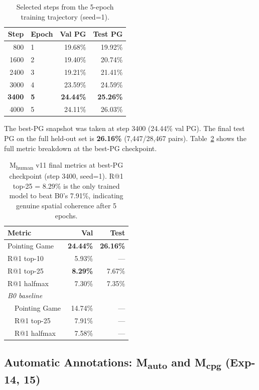 \documentclass{article}
\begin{document}
\begin{table}[H]
\centering
\caption{Selected steps from the 5-epoch training trajectory (seed=1).}
\label{tab:v11traj}
\begin{tabular}{rlrr}
\toprule
Step & Epoch & Val PG & Test PG \\
\midrule
800  & 1 & 19.68\% & 19.92\% \\
1600 & 2 & 19.40\% & 20.74\% \\
2400 & 3 & 19.21\% & 21.41\% \\
3000 & 4 & 23.59\% & 24.59\% \\
\textbf{3400} & \textbf{5} & \textbf{24.44\%} & \textbf{25.26\%} \\
4000 & 5 & 24.11\% & 26.03\% \\
\bottomrule
\end{tabular}
\end{table}

The best-PG snapshot was taken at step 3400 (24.44\% val PG). The final test
PG on the full held-out set is \textbf{26.16\%} (7,447/28,467 pairs).
Table~\ref{tab:v11final} shows the full metric breakdown at the best-PG
checkpoint.

\begin{table}[H]
\centering
\caption{M\textsubscript{human} v11 final metrics at best-PG checkpoint
(step 3400, seed=1). R@1 top-25 = 8.29\% is the only trained model to
beat B0's 7.91\%, indicating genuine spatial coherence after 5 epochs.}
\label{tab:v11final}
\begin{tabular}{lrr}
\toprule
Metric & Val & Test \\
\midrule
Pointing Game     & \textbf{24.44\%} & \textbf{26.16\%} \\
R@1 top-10        & 5.93\%  & ---    \\
R@1 top-25        & \textbf{8.29\%}  & 7.67\% \\
R@1 halfmax       & 7.30\%  & 7.35\% \\
\midrule
\textit{B0 baseline} & & \\
~~Pointing Game   & 14.74\% & ---    \\
~~R@1 top-25      & 7.91\%  & ---    \\
~~R@1 halfmax     & 7.58\%  & ---    \\
\bottomrule
\end{tabular}
\end{table}

\subsection{Automatic Annotations: M\textsubscript{auto} and M\textsubscript{cpg} (Exp-14, 15)}
\label{sec:mauto}
\end{document}
